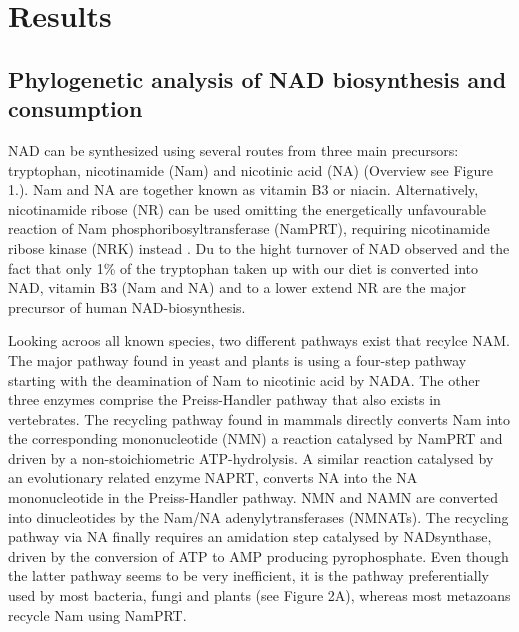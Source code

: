 \section{Results}

\subsection{Phylogenetic analysis of NAD biosynthesis and consumption}

NAD can be synthesized using several routes from three main precursors: tryptophan, nicotinamide (Nam) and nicotinic acid (NA) (Overview see Figure 1.). Nam and NA are together known as vitamin B3 or niacin. Alternatively, nicotinamide ribose (NR) can be used omitting the energetically unfavourable reaction of Nam phosphoribosyltransferase (NamPRT), requiring nicotinamide ribose kinase (NRK) instead \cite{Yoshino2018}. Du to the hight turnover of NAD observed and the fact that only 1\% of the tryptophan taken up with our diet is converted into NAD, vitamin B3 (Nam and NA) and to a lower extend NR are the major precursor of human NAD-biosynthesis.

Looking acroos all known species,   two different pathways exist that recylce NAM. The major pathway found in yeast and plants is using a four-step pathway starting with the deamination of Nam to nicotinic acid by NADA. The other three enzymes comprise the Preiss-Handler pathway that also exists in vertebrates. The recycling pathway found in mammals directly converts Nam into the corresponding mononucleotide (NMN) a reaction catalysed by NamPRT and driven by a non-stoichiometric ATP-hydrolysis. A similar reaction catalysed by an evolutionary related enzyme NAPRT, converts NA into the NA mononucleotide in the Preiss-Handler pathway. NMN and NAMN are converted into dinucleotides by the Nam/NA adenylytransferases (NMNATs). The recycling pathway via NA finally requires an amidation step catalysed by NADsynthase, driven by the conversion of ATP to AMP producing pyrophosphate. Even though the latter pathway seems to be very inefficient, it is the pathway preferentially used by most bacteria, fungi and plants (see Figure 2A), whereas most metazoans recycle Nam using NamPRT.

